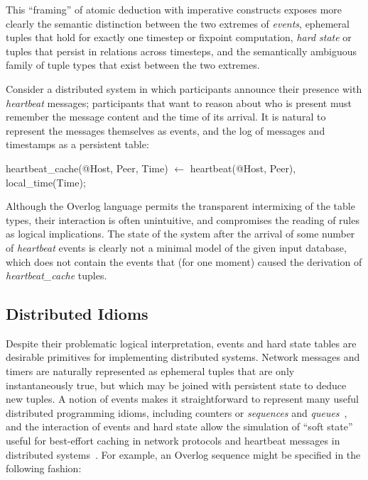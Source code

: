 This ``framing'' of atomic deduction with imperative constructs exposes more clearly the 
semantic distinction between the two extremes of \emph{events}, ephemeral tuples that 
hold for exactly one timestep or fixpoint computation, \emph{hard state} or tuples that 
persist in relations across timesteps, and the semantically ambiguous family of tuple types
that exist between the two extremes. 

Consider a distributed system in which participants announce their presence with 
\emph{heartbeat} messages; participants that want to reason about who is present must
remember the message content and the time of its arrival.  It is natural to represent the messages 
themselves as events, and the log of messages and timestamps as a persistent table:

\begin{Dedalus}
heartbeat\_cache(@Host, Peer, Time) \(\leftarrow\) 
  heartbeat(@Host, Peer), local\_time(Time);
\end{Dedalus}

 Although the Overlog language permits the transparent
intermixing of the table types, their interaction is often unintuitive, and compromises the
reading of rules as logical implications.  The state of the system after the arrival of some
number of \emph{heartbeat} events is clearly not a minimal model of the given input database,
which does not contain the events that (for one moment) caused the derivation of 
\emph{heartbeat\_cache} tuples.




\subsection{Distributed Idioms}

Despite their problematic logical interpretation, events and hard state tables are desirable 
primitives for implementing distributed systems.  Network messages and timers are naturally represented as ephemeral tuples that are only instantaneously true, but which may be joined 
with persistent state to deduce new tuples.  A notion of events makes it straightforward to
represent many useful distributed programming idioms, including counters or \emph{sequences} and \emph{queues}~\cite{netdb}, and the interaction of events and hard state allow the simulation of ``soft state'' useful for best-effort caching in network protocols and heartbeat messages in distributed systems~\cite{boom-techr}.  For example,  an Overlog sequence might be specified in the following fashion:

